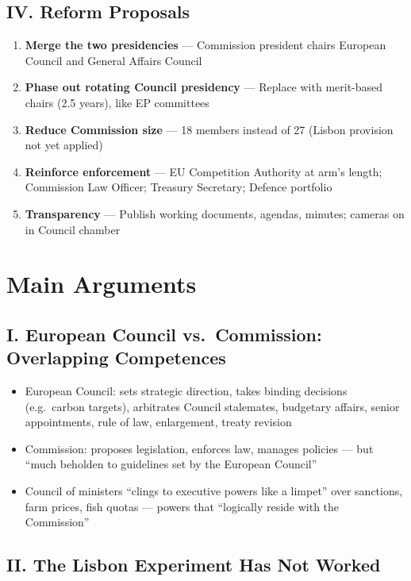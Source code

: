 \documentclass[11pt,a4paper]{article}
\begin{document}
\subsection*{IV. Reform Proposals}

\begin{enumerate}
\item \textbf{Merge the two presidencies} --- Commission president chairs European Council and General Affairs Council
\item \textbf{Phase out rotating Council presidency} --- Replace with merit-based chairs (2.5 years), like EP committees
\item \textbf{Reduce Commission size} --- 18 members instead of 27 (Lisbon provision not yet applied)
\item \textbf{Reinforce enforcement} --- EU Competition Authority at arm's length; Commission Law Officer; Treasury Secretary; Defence portfolio
\item \textbf{Transparency} --- Publish working documents, agendas, minutes; cameras on in Council chamber
\end{enumerate}

\section*{Main Arguments}

\subsection*{I. European Council vs.\ Commission: Overlapping Competences}

\begin{itemize}
\item European Council: sets strategic direction, takes binding decisions (e.g.\ carbon targets), arbitrates Council stalemates, budgetary affairs, senior appointments, rule of law, enlargement, treaty revision
\item Commission: proposes legislation, enforces law, manages policies --- but ``much beholden to guidelines set by the European Council''
\item Council of ministers ``clings to executive powers like a limpet'' over sanctions, farm prices, fish quotas --- powers that ``logically reside with the Commission''
\end{itemize}

\subsection*{II. The Lisbon Experiment Has Not Worked}
\end{document}
